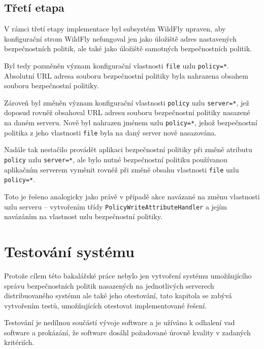 \section{Třetí etapa}

V rámci třetí etapy implementace byl subsystém WildFly upraven, aby konfigurační strom WildFly nefungoval jen jako úložiště adres nastavených bezpečnostních politik, ale také jako úložiště samotných bezpečnostních politik.

Byl tedy pozměněn význam konfigurační vlastnosti {\tt file} uzlu {\tt policy=*}. Absolutní URL adresa souboru  bezpečnostní politiky byla nahrazena obsahem souboru bezpečnostní politiky.

Zároveň byl změněn význam konfigurační vlastnosti {\tt policy} uzlu {\tt server=*}, jež doposud rovněž obsahoval URL adresu souboru bezpečnostní politiky nasazené na daném serveru. Nově byl nahrazen jménem uzlu {\tt policy=*}, jehož bezpečnostní politika z jeho vlastnosti {\tt file} byla na daný server nově nasazována.

Nadále tak nestačilo provádět aplikaci bezpečnostní politiky při změně atributu {\tt policy} uzlu {\tt server=*}, ale bylo nutné bezpečnostní politiku používanou aplikačním serverem vyměnit rovněž při změně obsahu vlastnosti {\tt file} uzlu {\tt policy=*}.

Toto je řešeno analogicky jako právě v případě akce navázané na změnu vlastnosti uzlu serveru -- vytvořením třídy {\tt PolicyWriteAttributeHandler} a jejím navázáním na vlastnost uzlu bezpečnostní politiky.

\chapter{Testování systému}

Protože cílem této bakalářské práce nebylo jen vytvoření systému umožňujícího správu bezpečnostních politik nasazených na jednotlivých serverech distribuovaného systému ale také jeho otestování, tato kapitola se zabývá vytvořením testů, umožňujících otestovat implementované řešení.

Testování je nedílnou součástí vývoje software a je užíváno k odhalení vad software a prokázání, že software dosáhl požadované úrovně kvality v zadaných kritériích. \cite{ivsTest}

